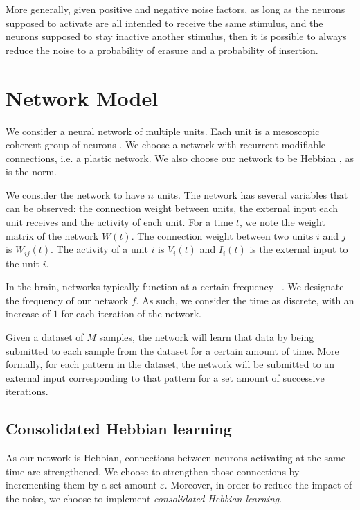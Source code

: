 \documentclass[journal]{IEEEtran}
\begin{document}

More generally, given positive and negative noise factors, as long as the neurons supposed to activate are all intended to receive the same stimulus, and the neurons supposed to stay inactive another stimulus, then it is possible to always reduce the noise to a probability of erasure and a probability of insertion.

\section{Network Model}

We consider a neural network of multiple units. Each unit is a mesoscopic coherent group of neurons \cite{galtier2012hebbian}. We choose a network with recurrent modifiable connections, i.e. a plastic network. We also choose our network to be Hebbian \cite{hagan1996neural}, as is the norm.

We consider the network to have $n$ units. The network has several variables that can be observed: the connection weight between units, the external input each unit receives and the activity of each unit. For a time $t$, we note the weight matrix of the network $W(t)$. The connection weight between two units $i$ and $j$  is $W_{ij}(t)$. The activity of a unit $i$ is $V_i(t)$ and $I_i(t)$ is the external input to the unit $i$. 

In the brain, networks typically function at a certain frequency~\cite{buzsaki2004neuronal} . We designate the frequency of our network $f$. As such, we consider the time as discrete, with an increase of $1$ for each iteration of the network.

Given a dataset of $M$ samples, the network will learn that data by being submitted to each sample from the dataset for a certain amount of time. More formally, for each pattern in the dataset, the network will be submitted to an external input corresponding to that pattern for a set amount of successive iterations.

\subsection{Consolidated Hebbian learning}

As our network is Hebbian, connections between neurons activating at the same time are strengthened. We choose to strengthen those connections by incrementing them by a set amount $\varepsilon$. Moreover, in order to reduce the impact of the noise, we choose to implement \emph{consolidated Hebbian learning}\cite{fusi2000spike,gerstner2002mathematical}. 
\end{document}
